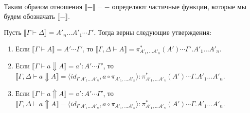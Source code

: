 \documentclass{amsart}
\theoremstyle{definition}
\theoremstyle{remark}
\renewcommand{\ll}{\llbracket}
\newcommand{\rr}{\rrbracket}
\numberwithin{figure}{section}
\begin{document}
Таким образом отношения $\ll - \rr = -$ определяют частичные функции, которые мы будем обозначать $\ll - \rr$.

\begin{comment}
\begin{lem}[correctness-subst][Correctness of the substitution]
Пусть $\ll \Gamma \vdash a : A \rr = a : A \dotsb \Gamma$.
Тогда верны следующие утверждения:
\begin{enumerate}
\item Если $\ll \Gamma, x : A, \Delta \vdash \rr = D$, то 
\item Если $\ll \Gamma, x : A, \Delta \vdash B \rr = B \dotsb D$
\end{enumerate}
\end{lem}
\end{comment}

\begin{lem}
Пусть $\ll \Gamma \vdash \Delta\rr = A'_n \ldots A'_1 \dotsb \Gamma'$.
Тогда верны следующие утверждения:
\begin{enumerate}
\item Если $\ll \Gamma \vdash A \rr = A' \dotsb \Gamma'$, то $\ll \Gamma, \Delta \vdash A \rr = \pi_{A'_1, \ldots A'_n}^*(A') \dotsb \Gamma'.A'_1 \ldots A'_n$.
\item Если $\ll \Gamma \vdash a \Downarrow A \rr = a' : A' \dotsb \Gamma'$, то $\ll \Gamma, \Delta \vdash a \Downarrow A \rr = \langle id_{\Gamma.A'_1 \ldots A'_n}, a \circ \pi_{A'_1, \ldots A'_n} \rangle : \pi_{A'_1, \ldots A'_n}^*(A') \dotsb \Gamma.A'_1 \ldots A'_n$.
\item Если $\ll \Gamma \vdash a \Uparrow A \rr = a' : A' \dotsb \Gamma'$, то $\ll \Gamma, \Delta \vdash a \Uparrow A \rr = \langle id_{\Gamma.A'_1 \ldots A'_n}, a \circ \pi_{A'_1, \ldots A'_n} \rangle : \pi_{A'_1, \ldots A'_n}^*(A') \dotsb \Gamma.A'_1 \ldots A'_n$.
\end{enumerate}
\end{lem}
\end{document}
